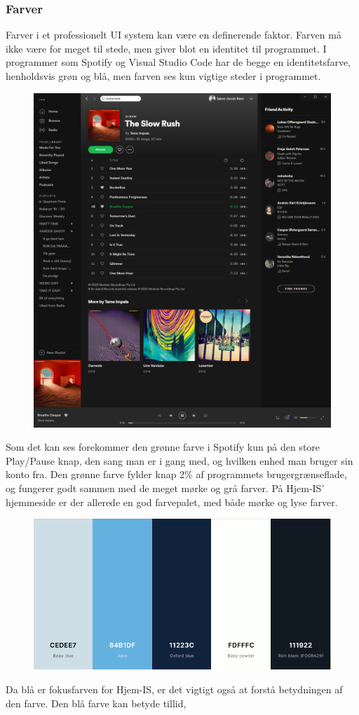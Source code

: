 \subsubsection{Farver}
Farver i et professionelt UI system kan være en definerende faktor. Farven må ikke være for meget til stede, men giver blot en identitet til programmet. I programmer som Spotify og Visual Studio Code har de begge en identitetsfarve, henholdsvis grøn og blå, men farven ses kun vigtige steder i programmet. 
\begin{figure}
    \centering
    \includegraphics[width=\textwidth]{figures/Preliminary/Spotify.png}
    \label{fig:spotify}
\end{figure}
Som det kan ses forekommer den grønne farve i Spotify kun på den store Play/Pause knap, den sang man er i gang med, og hvilken enhed man bruger sin konto fra. Den grønne farve fylder knap 2\% af programmets brugergrænseflade, og fungerer godt sammen med de meget mørke og grå farver. 
På Hjem-IS' hjemmeside er der allerede en god farvepalet, med både mørke og lyse farver. 
\begin{figure}
    \centering
    \includegraphics[width=\textwidth]{figures/Preliminary/farvepalet.png}
    \label{fig:farvepalet}
\end{figure}
Da blå er fokusfarven for Hjem-IS, er det vigtigt også at forstå betydningen af den farve. Den blå farve kan betyde tillid, 